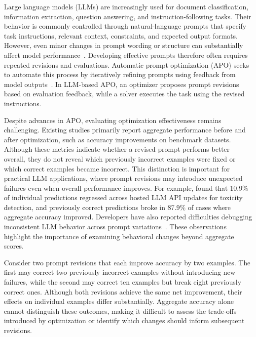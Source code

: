 \documentclass[11pt]{article}
\begin{document}
Large language models (LLMs) are increasingly used for document classification, information extraction, question answering, and instruction-following tasks. Their behavior is commonly controlled through natural-language prompts that specify task instructions, relevant context, constraints, and expected output formats. However, even minor changes in prompt wording or structure can substantially affect model performance~\citep{sclar2024quantifying}. Developing effective prompts therefore often requires repeated revisions and evaluations. Automatic prompt optimization (APO) seeks to automate this process by iteratively refining prompts using feedback from model outputs~\citep{zhou2023ape,yang2024opro,pryzant2023protegi}. In LLM-based APO, an optimizer proposes prompt revisions based on evaluation feedback, while a solver executes the task using the revised instructions.

Despite advances in APO, evaluating optimization effectiveness remains challenging. Existing studies primarily report aggregate performance before and after optimization, such as accuracy improvements on benchmark datasets. Although these metrics indicate whether a revised prompt performs better overall, they do not reveal which previously incorrect examples were fixed or which correct examples became incorrect. This distinction is important for practical LLM applications, where prompt revisions may introduce unexpected failures even when overall performance improves. For example, \citet{ma2024regression} found that 10.9\% of individual predictions regressed across hosted LLM API updates for toxicity detection, and previously correct predictions broke in 87.9\% of cases where aggregate accuracy improved. Developers have also reported difficulties debugging inconsistent LLM behavior across prompt variations~\citep{errica2025wrong}. These observations highlight the importance of examining behavioral changes beyond aggregate scores.

Consider two prompt revisions that each improve accuracy by two examples. The first may correct two previously incorrect examples without introducing new failures, while the second may correct ten examples but break eight previously correct ones. Although both revisions achieve the same net improvement, their effects on individual examples differ substantially. Aggregate accuracy alone cannot distinguish these outcomes, making it difficult to assess the trade-offs introduced by optimization or identify which changes should inform subsequent revisions.
\end{document}
